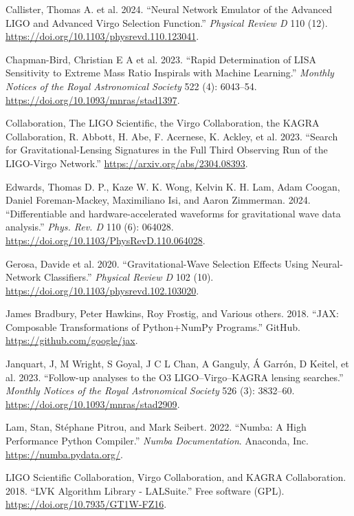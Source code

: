 \documentclass[10pt,a4paper,onecolumn]{article}
\newlength{\cslhangindent}
\newenvironment{CSLReferences}[3] %
 {%
  \setlength{\parindent}{0pt}
  \ifodd #1 \everypar{\setlength{\hangindent}{\cslhangindent}}\ignorespaces\fi
  \ifnum #2 > 0
  \setlength{\parskip}{#2\baselineskip}
  \fi
 }%
 {}
\begin{document}
\begin{CSLReferences}{1}{0}
\bibitem[\citeproctext]{ref-Callister:2024}
Callister, Thomas A. et al. 2024. {``Neural Network Emulator of the
Advanced LIGO and Advanced Virgo Selection Function.''} \emph{Physical
Review D} 110 (12). \url{https://doi.org/10.1103/physrevd.110.123041}.

Chapman-Bird, Christian E A et al. 2023. {``Rapid Determination of LISA
Sensitivity to Extreme Mass Ratio Inspirals with Machine Learning.''}
\emph{Monthly Notices of the Royal Astronomical Society} 522 (4):
6043--54. \url{https://doi.org/10.1093/mnras/stad1397}.

Collaboration, The LIGO Scientific, the Virgo Collaboration, the KAGRA
Collaboration, R. Abbott, H. Abe, F. Acernese, K. Ackley, et al. 2023.
{``Search for Gravitational-Lensing Signatures in the Full Third
Observing Run of the LIGO-Virgo Network.''}
\url{https://arxiv.org/abs/2304.08393}.

Edwards, Thomas D. P., Kaze W. K. Wong, Kelvin K. H. Lam, Adam Coogan,
Daniel Foreman-Mackey, Maximiliano Isi, and Aaron Zimmerman. 2024.
{``{Differentiable and hardware-accelerated waveforms for gravitational
wave data analysis}.''} \emph{Phys. Rev. D} 110 (6): 064028.
\url{https://doi.org/10.1103/PhysRevD.110.064028}.

Gerosa, Davide et al. 2020. {``Gravitational-Wave Selection Effects
Using Neural-Network Classifiers.''} \emph{Physical Review D} 102 (10).
\url{https://doi.org/10.1103/physrevd.102.103020}.

James Bradbury, Peter Hawkins, Roy Frostig, and Various others. 2018.
{``JAX: Composable Transformations of Python+NumPy Programs.''} GitHub.
\url{https://github.com/google/jax}.

Janquart, J, M Wright, S Goyal, J C L Chan, A Ganguly, Á Garrón, D
Keitel, et al. 2023. {``{Follow-up analyses to the O3 LIGO--Virgo--KAGRA
lensing searches}.''} \emph{Monthly Notices of the Royal Astronomical
Society} 526 (3): 3832--60.
\url{https://doi.org/10.1093/mnras/stad2909}.

Lam, Stan, Stéphane Pitrou, and Mark Seibert. 2022. {``Numba: A High
Performance Python Compiler.''} \emph{Numba Documentation}. Anaconda,
Inc. \url{https://numba.pydata.org/}.

LIGO Scientific Collaboration, Virgo Collaboration, and KAGRA
Collaboration. 2018. {``{LVK} {A}lgorithm {L}ibrary - {LALS}uite.''}
Free software (GPL). \url{https://doi.org/10.7935/GT1W-FZ16}.


\end{CSLReferences}
\end{document}
